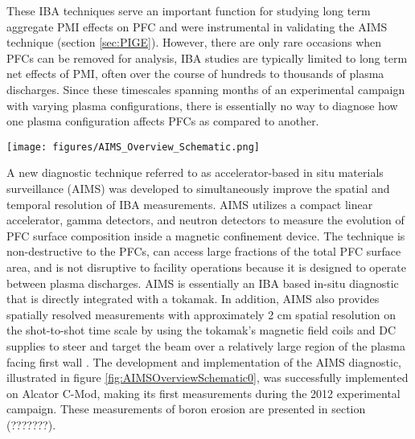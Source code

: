 \documentclass[final,3p,times,twocolumn]{elsarticle}
\begin{document}
These IBA techniques serve an important function for studying long term aggregate PMI effects on PFC \cite{wright2011plasma} and were instrumental in validating the AIMS technique (section \ref{sec:PIGE}). However, there are only rare occasions when PFCs can be removed for analysis, IBA studies are typically limited to long term net effects of PMI, often over the course of hundreds to thousands of plasma discharges.  Since these timescales spanning months of an experimental campaign with varying plasma configurations, there is essentially no way to diagnose how one plasma configuration affects PFCs as compared to another.

\begin{figure*}[h]
 \centering
  \texttt{[image: figures/AIMS\_Overview\_Schematic.png]}
 \caption{Left: CAD model of the AIMS diagnostic installed on Alcator C-Mod.  Right: Schematic of AIMS components.  AIMS utilizes a radio frequency quadrupole (RFQ) accelerator produce a 900 keV D$^+$ beam to induce nuclear reactions on the surface of plasma facing components (PFC). Spectroscopy of the resulting neutrons and gamma rays allow for the identification and quantification of isotopes on PFC surfaces. AIMS uses beam optics and toroidal field $B_\phi$ to steer the beam and achive spatially resolved measurements.}
 \label{fig:AIMSOverviewSchematic0}
\end{figure*}

A new diagnostic technique referred to as accelerator-based in situ materials surveillance (AIMS) was developed to simultaneously improve the spatial and temporal resolution of IBA measurements. AIMS utilizes a compact linear accelerator, gamma detectors, and neutron detectors to measure the evolution of PFC surface composition inside a magnetic confinement device. The technique is non-destructive to the PFCs, can access large fractions of the total PFC surface area, and is not disruptive to facility operations because it is designed to operate between plasma discharges. AIMS is essentially an IBA based in-situ diagnostic that is directly integrated with a tokamak. In addition, AIMS also provides spatially resolved measurements with approximately 2 cm spatial resolution on the shot-to-shot time scale by using the tokamak's magnetic field coils and DC supplies to steer and target the beam over a relatively large region of the plasma facing first wall \cite{RSIPaper}.  The development and implementation of the AIMS diagnostic, illustrated in figure \ref{fig:AIMSOverviewSchematic0}, was successfully implemented on Alcator C-Mod, making its first measurements during the 2012 experimental campaign. These measurements of boron erosion are presented in section (???????).
\end{document}
